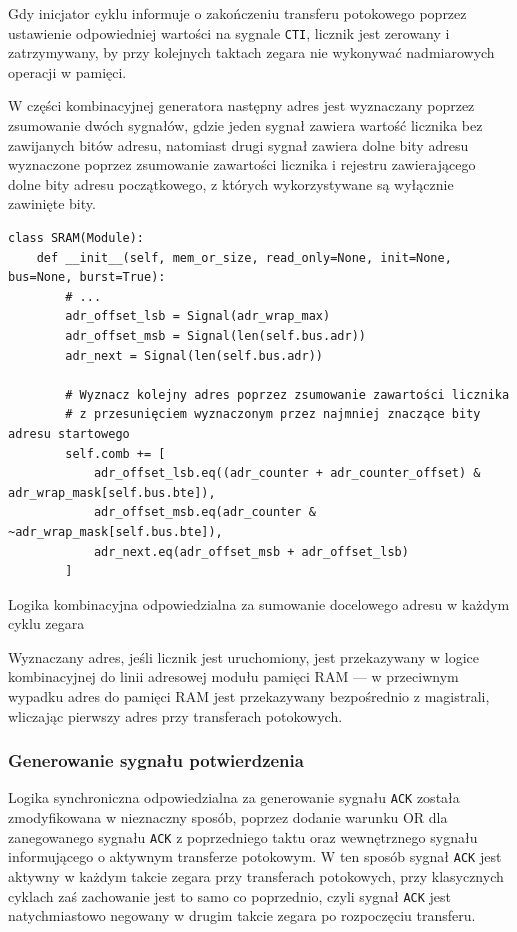 Gdy inicjator cyklu informuje o zakończeniu transferu potokowego poprzez ustawienie odpowiedniej wartości na sygnale \texttt{CTI}, licznik jest zerowany i zatrzymywany, by przy kolejnych taktach zegara nie wykonywać nadmiarowych operacji w pamięci.

W części kombinacyjnej generatora następny adres jest wyznaczany poprzez zsumowanie dwóch sygnałów, gdzie jeden sygnał zawiera wartość licznika bez zawijanych bitów adresu, natomiast drugi sygnał zawiera dolne bity adresu wyznaczone poprzez zsumowanie zawartości licznika i rejestru zawierającego dolne bity adresu początkowego, z których wykorzystywane są wyłącznie zawinięte bity.

\begin{listing}[H]
\begin{verbatim}
class SRAM(Module):
    def __init__(self, mem_or_size, read_only=None, init=None, bus=None, burst=True):
        # ...
        adr_offset_lsb = Signal(adr_wrap_max)
        adr_offset_msb = Signal(len(self.bus.adr))
        adr_next = Signal(len(self.bus.adr))

        # Wyznacz kolejny adres poprzez zsumowanie zawartości licznika
        # z przesunięciem wyznaczonym przez najmniej znaczące bity adresu startowego
        self.comb += [
            adr_offset_lsb.eq((adr_counter + adr_counter_offset) & adr_wrap_mask[self.bus.bte]),
            adr_offset_msb.eq(adr_counter & ~adr_wrap_mask[self.bus.bte]),
            adr_next.eq(adr_offset_msb + adr_offset_lsb)
        ]
\end{verbatim}
\caption{Logika kombinacyjna odpowiedzialna za sumowanie docelowego adresu w każdym cyklu zegara}
\label{lst:impl-sram-adrnext}
\end{listing}

Wyznaczany adres, jeśli licznik jest uruchomiony, jest przekazywany w logice kombinacyjnej do linii adresowej modułu pamięci RAM --- w przeciwnym wypadku adres do pamięci RAM jest przekazywany bezpośrednio z magistrali, wliczając pierwszy adres przy transferach potokowych.

\subsubsection{Generowanie sygnału potwierdzenia}

Logika synchroniczna odpowiedzialna za generowanie sygnału \texttt{ACK} została zmodyfikowana w nieznaczny sposób, poprzez dodanie warunku OR dla zanegowanego sygnału \texttt{ACK} z poprzedniego taktu oraz wewnętrznego sygnału informującego o aktywnym transferze potokowym. W ten sposób sygnał \texttt{ACK} jest aktywny w każdym takcie zegara przy transferach potokowych, przy klasycznych cyklach zaś zachowanie jest to samo co poprzednio, czyli sygnał \texttt{ACK} jest natychmiastowo negowany w drugim takcie zegara po rozpoczęciu transferu.

